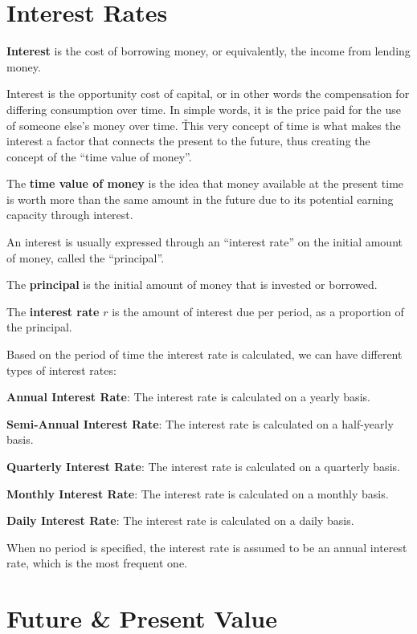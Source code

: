 \section{Interest Rates}

\bd[Interest]
\textbf{Interest} is the cost of borrowing money, or equivalently, the income from lending money.
\ed

Interest is the opportunity cost of capital, or in other words the compensation for differing consumption over time.
In simple words, it is the price paid for the use of someone else's money over time.
\v

This very concept of time is what makes the interest a factor that connects the present to the future, thus creating
the concept of the ``time value of money''.

The \textbf{time value of money} is the idea that money available at the present time is worth more than the same
amount in the future due to its potential earning capacity through interest.
\ed

An interest is usually expressed through an ``interest rate'' on the initial amount of money, called the ``principal''.

\bd[Principal]
The \textbf{principal} is the initial amount of money that is invested or borrowed.
\ed

The \textbf{interest rate} $r$ is the amount of interest due per period, as a proportion of the principal.
\ed

Based on the period of time the interest rate is calculated, we can have different types of interest rates:
\bit
\item \textbf{Annual Interest Rate}: The interest rate is calculated on a yearly basis.
\item \textbf{Semi-Annual Interest Rate}: The interest rate is calculated on a half-yearly basis.
\item \textbf{Quarterly Interest Rate}: The interest rate is calculated on a quarterly basis.
\item \textbf{Monthly Interest Rate}: The interest rate is calculated on a monthly basis.
\item \textbf{Daily Interest Rate}: The interest rate is calculated on a daily basis.
\eit

When no period is specified, the interest rate is assumed to be an annual interest rate, which is the most frequent
one.

\section{Future \& Present Value}

